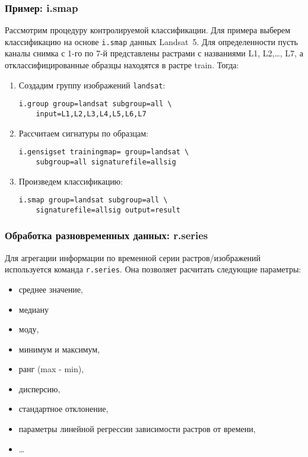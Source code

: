 \begin{frame}[fragile]
    \frametitle{Пример: i.smap}
    Рассмотрим процедуру контролируемой классификации. Для примера выберем классификацию на основе \lstinline!i.smap! данных Landsat~5. Для определенности пусть каналы снимка с 1-го по 7-й представлены растрами с названиями L1, L2,\dots, L7, а отклассифицированные образцы находятся в растре train. Тогда:
    \begin{enumerate}
        \item Создадим группу изображений \lstinline!landsat!:
        \begin{lstlisting}
i.group group=landsat subgroup=all \
    input=L1,L2,L3,L4,L5,L6,L7
        \end{lstlisting}
        \item Рассчитаем сигнатуры по образцам:
        \begin{lstlisting}
i.gensigset trainingmap= group=landsat \
    subgroup=all signaturefile=allsig
        \end{lstlisting}
        \item Произведем классификацию:
        \begin{lstlisting}
i.smap group=landsat subgroup=all \
    signaturefile=allsig output=result
        \end{lstlisting}
    \end{enumerate}
\end{frame}

\begin{frame}
    \frametitle{Обра\-бот\-ка раз\-новре\-мен\-ных данных: r.series}
    Для агрегации информации по временной серии растров/изображений используется команда \lstinline!r.series!. Она позволяет расчитать следующие параметры:
    \begin{itemize}
        \item среднее значение,
        \item медиану
        \item моду,
        \item минимум и максимум,
        \item ранг (max - min),
        \item дисперсию,
        \item стандартное отклонение,
        \item параметры линейной регрессии зависимости растров от времени,
        \item \dots
    \end{itemize}
\end{frame}

